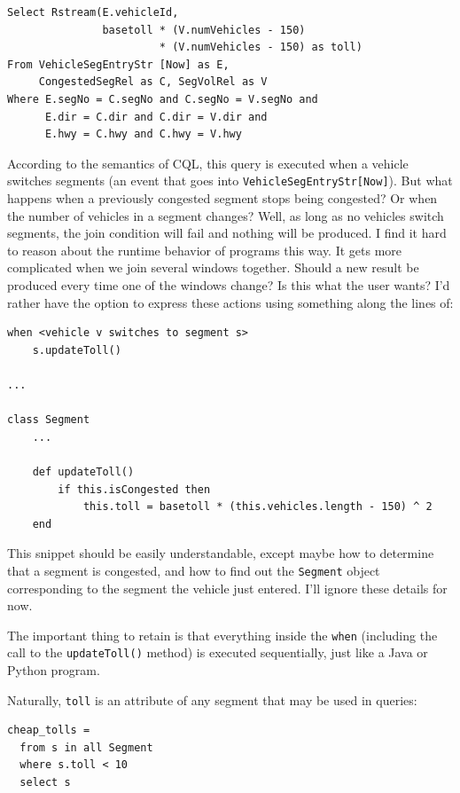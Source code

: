 \documentclass{report}
\begin{document}
\begin{verbatim}
Select Rstream(E.vehicleId,
               basetoll * (V.numVehicles - 150)
                        * (V.numVehicles - 150) as toll)
From VehicleSegEntryStr [Now] as E,
     CongestedSegRel as C, SegVolRel as V
Where E.segNo = C.segNo and C.segNo = V.segNo and
      E.dir = C.dir and C.dir = V.dir and
      E.hwy = C.hwy and C.hwy = V.hwy
\end{verbatim}

According to the semantics of CQL, this query is executed when a
vehicle switches segments (an event that goes into
\verb=VehicleSegEntryStr[Now]=). But what happens when a previously
congested segment stops being congested? Or when the number of
vehicles in a segment changes? Well, as long as no vehicles switch
segments, the join condition will fail and nothing will be produced. I
find it hard to reason about the runtime behavior of programs this
way. It gets more complicated when we join several windows
together. Should a new result be produced every time one of the
windows change? Is this what the user wants? I'd rather have the
option to express these actions using something along the lines of:

\begin{verbatim}
when <vehicle v switches to segment s>
    s.updateToll()

...

class Segment
    ...

    def updateToll()
        if this.isCongested then
            this.toll = basetoll * (this.vehicles.length - 150) ^ 2
    end

\end{verbatim}

This snippet should be easily understandable, except maybe how to
determine that a segment is congested, and how to find out the
\verb=Segment= object corresponding to the segment the vehicle just
entered. I'll ignore these details for now.

The important thing to retain is that everything inside the
\verb=when= (including the call to the \verb=updateToll()= method) is
executed sequentially, just like a Java or Python program.

Naturally, \verb=toll= is an attribute of any segment that may be used
in queries:

\begin{verbatim}
cheap_tolls =
  from s in all Segment
  where s.toll < 10
  select s
\end{verbatim}
\end{document}
